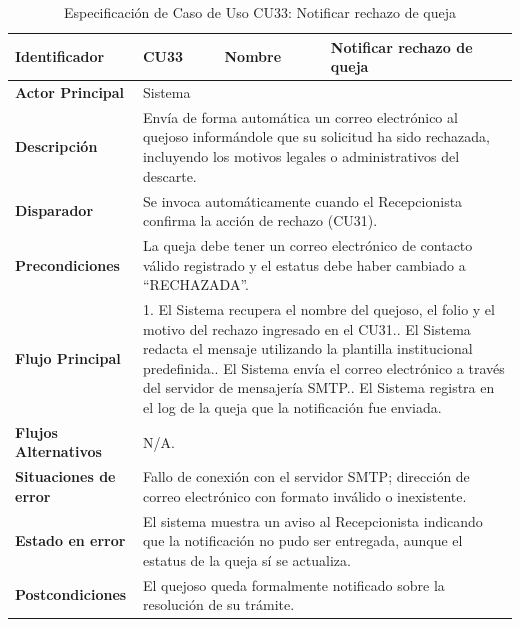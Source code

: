 \begingroup
\setlength{\parskip}{0pt}
\begin{longtable}{|p{3.5cm}|p{2cm}|p{2.5cm}|p{7cm}|}
\caption{Especificación de Caso de Uso CU33: Notificar rechazo de queja}
\label{tab:cu33_notificar_rechazo} \\
\hline
\textbf{Identificador} & CU33 & \textbf{Nombre} & Notificar rechazo de queja \\ \hline
\textbf{Actor Principal} & \multicolumn{3}{p{11.5cm}|}{Sistema} \\ \hline
\textbf{Descripción} & \multicolumn{3}{p{11.5cm}|}{Envía de forma automática un correo electrónico al quejoso informándole que su solicitud ha sido rechazada, incluyendo los motivos legales o administrativos del descarte.} \\ \hline
\textbf{Disparador} & \multicolumn{3}{p{11.5cm}|}{Se invoca automáticamente cuando el Recepcionista confirma la acción de rechazo (CU31).} \\ \hline
\textbf{Precondiciones} & \multicolumn{3}{p{11.5cm}|}{La queja debe tener un correo electrónico de contacto válido registrado y el estatus debe haber cambiado a ``RECHAZADA''.} \\ \hline
\textbf{Flujo Principal} & \multicolumn{3}{p{11.5cm}|}{1. El Sistema recupera el nombre del quejoso, el folio y el motivo del rechazo ingresado en el CU31.\newline 2. El Sistema redacta el mensaje utilizando la plantilla institucional predefinida.\newline 3. El Sistema envía el correo electrónico a través del servidor de mensajería SMTP.\newline 4. El Sistema registra en el log de la queja que la notificación fue enviada.} \\ \hline
\textbf{Flujos Alternativos} & \multicolumn{3}{p{11.5cm}|}{N/A.} \\ \hline
\textbf{Situaciones de error} & \multicolumn{3}{p{11.5cm}|}{Fallo de conexión con el servidor SMTP; dirección de correo electrónico con formato inválido o inexistente.} \\ \hline
\textbf{Estado en error} & \multicolumn{3}{p{11.5cm}|}{El sistema muestra un aviso al Recepcionista indicando que la notificación no pudo ser entregada, aunque el estatus de la queja sí se actualiza.} \\ \hline
\textbf{Postcondiciones} & \multicolumn{3}{p{11.5cm}|}{El quejoso queda formalmente notificado sobre la resolución de su trámite.} \\ \hline
\end{longtable}
\endgroup

